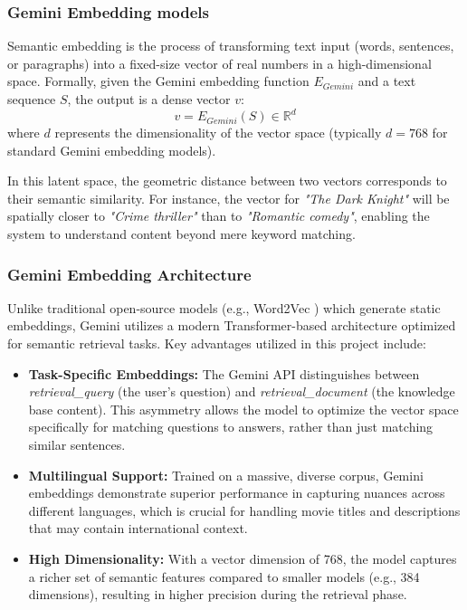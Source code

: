 \documentclass[a4paper, 12pt]{extreport}
\begin{document}
\subsubsection{Gemini Embedding models \cite{geminiembeddings}}
Semantic embedding is the process of transforming text input (words, sentences, or paragraphs) into a fixed-size vector of real numbers in a high-dimensional space. Formally, given the Gemini embedding function $E_{Gemini}$ and a text sequence $S$, the output is a dense vector $v$:
\begin{equation}
    v = E_{Gemini}(S) \in \mathbb{R}^d
\end{equation}
where $d$ represents the dimensionality of the vector space (typically $d=768$ for standard Gemini embedding models). 

In this latent space, the geometric distance between two vectors corresponds to their semantic similarity. For instance, the vector for \textit{"The Dark Knight"} will be spatially closer to \textit{"Crime thriller"} than to \textit{"Romantic comedy"}, enabling the system to understand content beyond mere keyword matching.

\subsubsection{Gemini Embedding Architecture}
Unlike traditional open-source models (e.g., Word2Vec \cite{w2v}) which generate static embeddings, Gemini utilizes a modern Transformer-based architecture \cite{attention} optimized for semantic retrieval tasks. Key advantages utilized in this project include:

\begin{itemize}
    \item \textbf{Task-Specific Embeddings:} The Gemini API distinguishes between \textit{retrieval\_query} (the user's question) and \textit{retrieval\_document} (the knowledge base content). This asymmetry allows the model to optimize the vector space specifically for matching questions to answers, rather than just matching similar sentences.
    \item \textbf{Multilingual Support:} Trained on a massive, diverse corpus, Gemini embeddings demonstrate superior performance in capturing nuances across different languages, which is crucial for handling movie titles and descriptions that may contain international context.
    \item \textbf{High Dimensionality:} With a vector dimension of 768, the model captures a richer set of semantic features compared to smaller models (e.g., 384 dimensions), resulting in higher precision during the retrieval phase.
\end{itemize}
\end{document}
